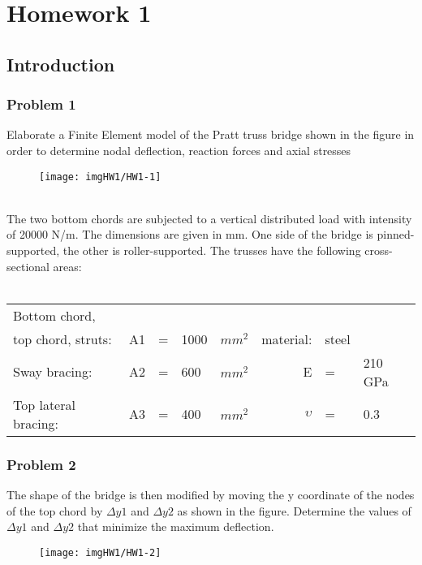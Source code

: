 \chapter{Homework 1}
\section{Introduction}
\subsection{Problem 1}
Elaborate a Finite Element model of the Pratt truss bridge shown in the figure in order to determine nodal deflection, reaction forces and axial stresses
\begin{figure}[h]
\centering %
\texttt{[image: imgHW1/HW1-1]} 
\end{figure}
\\The two bottom chords are subjected to a vertical distributed load with intensity of 20000 N/m.
The dimensions are given in mm. One side of the bridge is pinned-supported, the other is
roller-supported. The trusses have the following cross-sectional areas:\\\\
\begin{tabular}{lccllrll}
Bottom chord,\\ 
top chord,  struts:	& A1 	& = 	& 1000	&$mm^2$	& material: 	&steel\\
Sway bracing:			& A2		& =	& 600 		&$mm^2$	& E 				&	=	&210 GPa\\
Top lateral bracing:	& A3		& =	& 400		&$mm^2$	& $\upsilon$&	= 	&0.3\\
\end{tabular}
\subsection{Problem 2}
The shape of the bridge is then modified by moving the y coordinate of the nodes of the
top chord by $\Delta y1$ and $\Delta y2$ as shown in the figure. Determine the values of $\Delta y1$ and $\Delta y2$ that
minimize the maximum deflection.
\begin{figure}[h]
\centering %
\texttt{[image: imgHW1/HW1-2]}
\end{figure}
